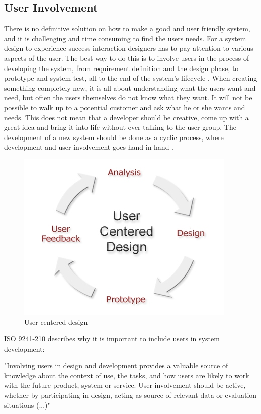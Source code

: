 \subsection{User Involvement}
There is no definitive solution on how to make a good and user friendly system, and it is challenging and time consuming to find the users needs. For a system design to experience success interaction designers has to pay attention to various aspects of the user. The best way to do this is to involve users in the process of developing the system, from requirement definition and the design phase, to prototype and system test, all to the end of the system's lifecycle \cite{mmi}. When creating something completely new, it is all about understanding what the users want and need, but often the users themselves do not know what they want. It will not be possible to walk up to a potential customer and ask what he or she wants and needs. This does not mean that a developer should be creative, come up with a great idea and bring it into life without ever talking to the user group. The development of a new system should be done as a cyclic process, where development and user involvement goes hand in hand \cite{mmi}.  
\begin{figure} [ht!]
\centering
\includegraphics[scale=0.8]{userdesign.jpg}
\caption[User centered design]{User centered design \cite{userdesign}}
\label{userdesign}
\end{figure}

ISO 9241-210 describes why it is important to include users in system development:

"Involving users in design and development provides a valuable source of knowledge about the context of use, the tasks, and how users are likely to work with the future product, system or service. User involvement should be active, whether by participating in design, acting as source of relevant data or evaluation situations (...)"



